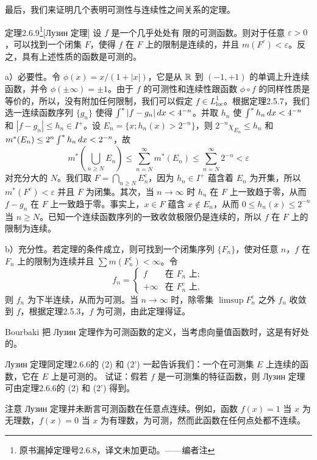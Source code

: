 最后，我们来证明几个表明可测性与连续性之间关系的定理。
\begin{statement}{定理}{2.6.9}\footnote{原书漏掉定理号2.6.8，译文未加更动。——编者注}[Лузин 定理]
设 $f$ 是一个几乎处处有
限的可测函数。则对于任意 $\varepsilon>0$，可以找到一个闭集 $F$，使得 $f$ 在 $F$ 上的限制是连续的，并且 $m(F^c)<\varepsilon$。反之，具有上述性质的函数是可测的。
\end{statement}
\Proof a）必要性。令 $\phi(x)=x/(1+|x|)$，它是从 $\mathbb R$ 到 $(-1,+1)$ 的单调上升连续函数，并令 $\phi(\pm\infty)=\pm1$。由于 $f$ 的可测性和连续性跟函数 $\phi\circ f$ 的同样性质是等价的，所以，没有附加任何限制，我们可以假定 $f\in L^1_{\mathrm{loc}}$。根据定理2.5.7，我们选一连续函数序列 $\{g_n\}$ 使得 $\int^{*}|f-g_n|\,dx<4^{-n}$。并取 $h_n$ 使 $\int^{*} h_n\,dx<4^{-n}$ 和 $|f-g_n|\le h_n\in I^+$。设 $E_n=\{x;h_n(x)>2^{-n}\}$，则 $2^{-n}\chi_{E_n}\le h_n$ 和 $m^*(E_n)\le2^n\int^{*} h_n\,dx<2^{-n}$，故
\[m^*\left(\bigcup_{n\ge N}E_n\right)\le\sum_{n=N}^\infty m^*(E_n)\le\sum_{n=N}^\infty2^{-n}<\varepsilon\]
对充分大的 $N$。我们取 $F=\bigcap_{n\ge N}E_n^c$，因为 $h_n\in I^+$ 蕴含着 $E_n$ 为开集，所以 $m^*(F^c)<\varepsilon$ 并且 $F$ 为闭集。其次，当 $n\to\infty$ 时 $h_n$ 在 $F$ 上一致趋于零，从而 $f-g_n$ 在 $F$ 上一致趋于零。事实上，$x\in F$ 蕴含 $x\notin E_n$，从而 $0\le h_n(x)\le2^{-n}$ 当 $n\ge N$。已知一个连续函数序列的一致收敛极限仍是连续的，所以 $f$ 在 $F$ 上的限制为连续。

b）充分性。若定理的条件成立，则可找到一个闭集序列 $\{F_n\}$，使对任意 $n$，$f$ 在 $F_n$ 上的限制为连续并且 $\sum m(F_n^c)<\infty$。令
\[f_n=\begin{cases}f&\text{在 }F_n\text{ 上};\\+\infty&\text{在 }F_n^c\text{ 上},\end{cases}\]
则 $f_n$ 为下半连续，从而为可测。当 $n\to\infty$ 时，除零集 $\limsup F_n^c$ 之外 $f_n$ 收敛到 $f$，根据定理2.5.3，$f$ 为可测，由此定理得证。

Bourbaki 把 Лузин 定理作为可测函数的定义，当考虑向量值函数时，这是有好处的。

Лузин 定理同定理2.6.6的 (2) 和 (2') 一起告诉我们：一个在可测集 $E$ 上连续的函数，它在 $E$ 上是可测的。
\Exercise 试证：假若 $f$ 是一可测集的特征函数，则 Лузин 定理可由定理2.6.6的 (2) 和 (2') 得到。

注意 Лузин 定理并未断言可测函数在任意点连续。例如，函数 $f(x)=1$ 当 $x$ 为无理数，$f(x)=0$ 当 $x$ 为有理数，为可测，然而此函数在任何点处都不连续。

